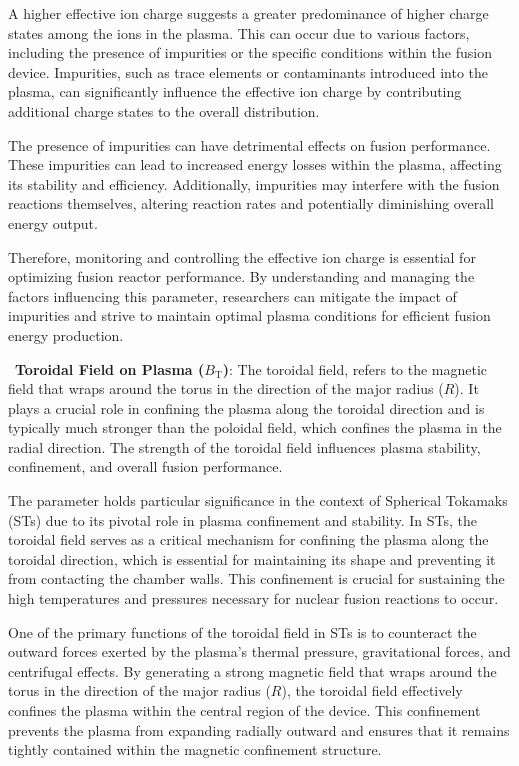 \documentclass[journal]{IEEEtran}
\begin{document}
A higher effective ion charge suggests a greater predominance of higher charge states among the ions in the plasma. This can occur due to various factors, including the presence of impurities or the specific conditions within the fusion device. Impurities, such as trace elements or contaminants introduced into the plasma, can significantly influence the effective ion charge by contributing additional charge states to the overall distribution.

The presence of impurities can have detrimental effects on fusion performance. These impurities can lead to increased energy losses within the plasma, affecting its stability and efficiency. Additionally, impurities may interfere with the fusion reactions themselves, altering reaction rates and potentially diminishing overall energy output.

Therefore, monitoring and controlling the effective ion charge is essential for optimizing fusion reactor performance. By understanding and managing the factors influencing this parameter, researchers can mitigate the impact of impurities and strive to maintain optimal plasma conditions for efficient fusion energy production.

~\textbf{Toroidal Field on Plasma ($B_{\text{T}}$)}: The toroidal field, refers to the magnetic field that wraps around the torus in the direction of the major radius ($R$). It plays a crucial role in confining the plasma along the toroidal direction and is typically much stronger than the poloidal field, which confines the plasma in the radial direction. The strength of the toroidal field influences plasma stability, confinement, and overall fusion performance. 

The parameter holds particular significance in the context of Spherical Tokamaks (STs) due to its pivotal role in plasma confinement and stability. In STs, the toroidal field serves as a critical mechanism for confining the plasma along the toroidal direction, which is essential for maintaining its shape and preventing it from contacting the chamber walls. This confinement is crucial for sustaining the high temperatures and pressures necessary for nuclear fusion reactions to occur.

One of the primary functions of the toroidal field in STs is to counteract the outward forces exerted by the plasma's thermal pressure, gravitational forces, and centrifugal effects. By generating a strong magnetic field that wraps around the torus in the direction of the major radius ($R$), the toroidal field effectively confines the plasma within the central region of the device. This confinement prevents the plasma from expanding radially outward and ensures that it remains tightly contained within the magnetic confinement structure.
\end{document}
